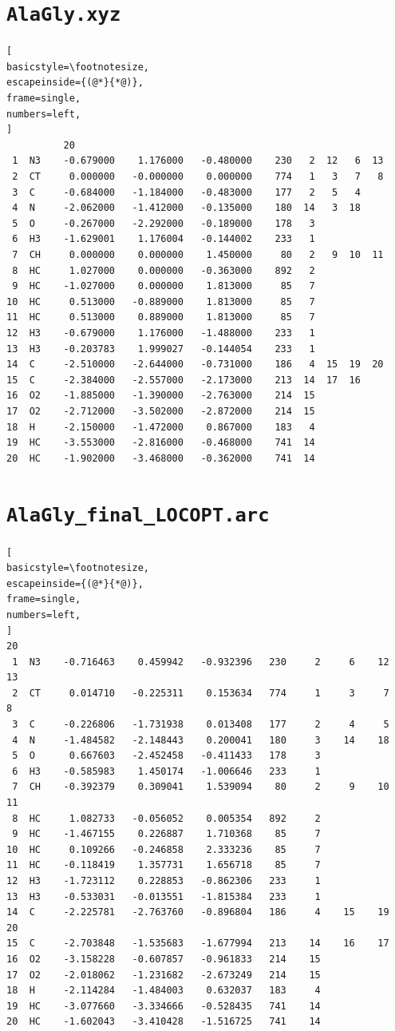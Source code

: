 \documentclass[a4paper,11pt]{scrartcl}
\begin{document}
\newpage

\appendix
\section{\texttt{AlaGly.xyz}}
\label{app:alaglytinker}
\begin{lstlisting}[
basicstyle=\footnotesize,
escapeinside={(@*}{*@)},
frame=single,
numbers=left,
]
          20  
 1  N3    -0.679000    1.176000   -0.480000    230   2  12   6  13
 2  CT     0.000000   -0.000000    0.000000    774   1   3   7   8
 3  C     -0.684000   -1.184000   -0.483000    177   2   5   4
 4  N     -2.062000   -1.412000   -0.135000    180  14   3  18
 5  O     -0.267000   -2.292000   -0.189000    178   3
 6  H3    -1.629001    1.176004   -0.144002    233   1
 7  CH     0.000000    0.000000    1.450000     80   2   9  10  11
 8  HC     1.027000    0.000000   -0.363000    892   2
 9  HC    -1.027000    0.000000    1.813000     85   7
10  HC     0.513000   -0.889000    1.813000     85   7
11  HC     0.513000    0.889000    1.813000     85   7
12  H3    -0.679000    1.176000   -1.488000    233   1
13  H3    -0.203783    1.999027   -0.144054    233   1
14  C     -2.510000   -2.644000   -0.731000    186   4  15  19  20
15  C     -2.384000   -2.557000   -2.173000    213  14  17  16
16  O2    -1.885000   -1.390000   -2.763000    214  15
17  O2    -2.712000   -3.502000   -2.872000    214  15
18  H     -2.150000   -1.472000    0.867000    183   4
19  HC    -3.553000   -2.816000   -0.468000    741  14
20  HC    -1.902000   -3.468000   -0.362000    741  14
\end{lstlisting}

\section{\texttt{AlaGly\_final\_LOCOPT.arc}}
\label{app:finalarc}
\begin{lstlisting}[
basicstyle=\footnotesize,
escapeinside={(@*}{*@)},
frame=single,
numbers=left,
]
20
 1  N3    -0.716463    0.459942   -0.932396   230     2     6    12    13
 2  CT     0.014710   -0.225311    0.153634   774     1     3     7     8
 3  C     -0.226806   -1.731938    0.013408   177     2     4     5
 4  N     -1.484582   -2.148443    0.200041   180     3    14    18
 5  O      0.667603   -2.452458   -0.411433   178     3
 6  H3    -0.585983    1.450174   -1.006646   233     1
 7  CH    -0.392379    0.309041    1.539094    80     2     9    10    11
 8  HC     1.082733   -0.056052    0.005354   892     2
 9  HC    -1.467155    0.226887    1.710368    85     7
10  HC     0.109266   -0.246858    2.333236    85     7
11  HC    -0.118419    1.357731    1.656718    85     7
12  H3    -1.723112    0.228853   -0.862306   233     1
13  H3    -0.533031   -0.013551   -1.815384   233     1
14  C     -2.225781   -2.763760   -0.896804   186     4    15    19    20
15  C     -2.703848   -1.535683   -1.677994   213    14    16    17
16  O2    -3.158228   -0.607857   -0.961833   214    15
17  O2    -2.018062   -1.231682   -2.673249   214    15
18  H     -2.114284   -1.484003    0.632037   183     4
19  HC    -3.077660   -3.334666   -0.528435   741    14
20  HC    -1.602043   -3.410428   -1.516725   741    14
\end{lstlisting}
\end{document}
